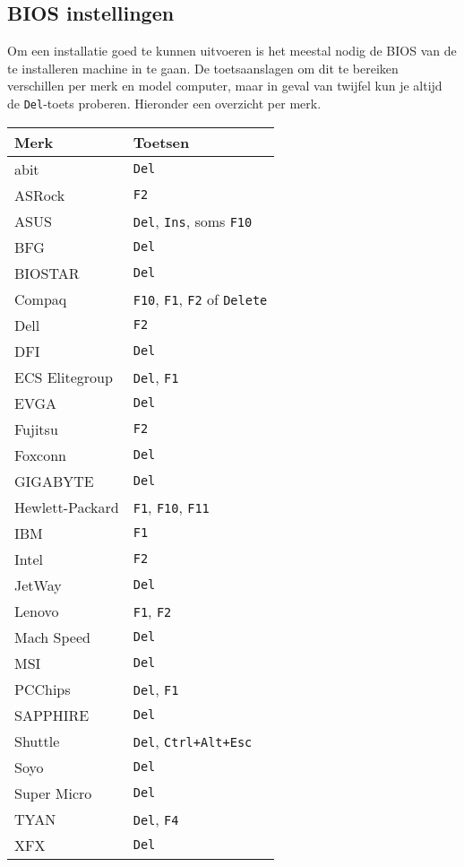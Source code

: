 \subsection{BIOS instellingen}
Om een installatie goed te kunnen uitvoeren is het meestal nodig de BIOS van de te installeren machine in te gaan. De toetsaanslagen om dit te bereiken verschillen per merk en model computer, maar in geval van twijfel kun je altijd de \texttt{Del}-toets proberen. Hieronder een overzicht per merk.
\begin{table}[H]
	\begin{tabular}{| l | l |}
	\hline 
	\textbf{Merk} & \textbf{Toetsen} \\
	\hline
	abit & \texttt{Del} \\
	\hline
	ASRock & \texttt{F2} \\
	\hline
	ASUS & \texttt{Del}, \texttt{Ins}, soms \texttt{F10} \\
	\hline
	BFG & \texttt{Del} \\
	\hline
	BIOSTAR & \texttt{Del} \\
	\hline
	Compaq & \texttt{F10}, \texttt{F1}, \texttt{F2} of \texttt{Delete}\\
	\hline
	Dell & \texttt{F2} \\
	\hline
	DFI & \texttt{Del} \\
	\hline
	ECS Elitegroup & \texttt{Del}, \texttt{F1} \\
	\hline
	EVGA & \texttt{Del} \\
	\hline
	Fujitsu & \texttt{F2} \\
	\hline
	Foxconn & \texttt{Del} \\
	\hline
	GIGABYTE & \texttt{Del} \\
	\hline
	Hewlett-Packard &  \texttt{F1}, \texttt{F10}, \texttt{F11} \\
	\hline
	IBM &  \texttt{F1} \\
	\hline
	Intel & \texttt{F2} \\
	\hline
	JetWay & \texttt{Del} \\
	\hline
	Lenovo &  \texttt{F1}, \texttt{F2} \\
	\hline
	Mach Speed & \texttt{Del} \\
	\hline
	MSI & \texttt{Del} \\
	\hline
	PCChips & \texttt{Del}, \texttt{F1} \\
	\hline
	SAPPHIRE & \texttt{Del} \\
	\hline
	Shuttle & \texttt{Del}, \texttt{Ctrl+Alt+Esc} \\
	\hline
	Soyo & \texttt{Del} \\
	\hline
	Super Micro & \texttt{Del} \\
	\hline
	TYAN & \texttt{Del}, \texttt{F4} \\
	\hline
	XFX & \texttt{Del} \\
	\hline
\end{tabular}
\end{table}
